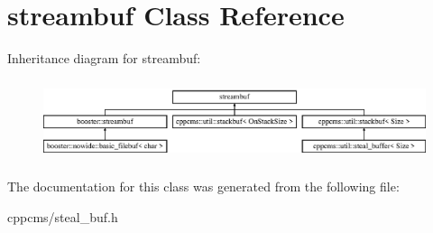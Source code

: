 \section{streambuf \-Class \-Reference}
\label{classstd_1_1streambuf}
\-Inheritance diagram for streambuf\-:\begin{figure}[H]
\begin{center}
\leavevmode
\includegraphics[height=2.372881cm]{classstd_1_1streambuf}
\end{center}
\end{figure}


\-The documentation for this class was generated from the following file\-:\begin{DoxyCompactItemize}
\item 
cppcms/steal\-\_\-buf.\-h\end{DoxyCompactItemize}
